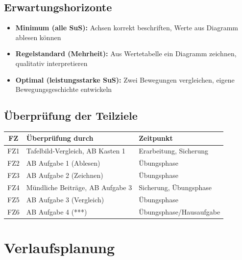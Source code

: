 \documentclass[11pt,a4paper]{article}
\begin{document}
\subsection{Erwartungshorizonte}
\begin{itemize}
    \item \textbf{Minimum (alle SuS):} Achsen korrekt beschriften, Werte aus Diagramm ablesen können
    \item \textbf{Regelstandard (Mehrheit):} Aus Wertetabelle ein Diagramm zeichnen, qualitativ interpretieren
    \item \textbf{Optimal (leistungsstarke SuS):} Zwei Bewegungen vergleichen, eigene Bewegungsgeschichte entwickeln
\end{itemize}

\subsection{Überprüfung der Teilziele}
\begin{tabular}{|c|l|l|}
\hline
\textbf{FZ} & \textbf{Überprüfung durch} & \textbf{Zeitpunkt} \\
\hline
FZ1 & Tafelbild-Vergleich, AB Kasten 1 & Erarbeitung, Sicherung \\
\hline
FZ2 & AB Aufgabe 1 (Ablesen) & Übungsphase \\
\hline
FZ3 & AB Aufgabe 2 (Zeichnen) & Übungsphase \\
\hline
FZ4 & Mündliche Beiträge, AB Aufgabe 3 & Sicherung, Übungsphase \\
\hline
FZ5 & AB Aufgabe 3 (Vergleich) & Übungsphase \\
\hline
FZ6 & AB Aufgabe 4 (***) & Übungsphase/Hausaufgabe \\
\hline
\end{tabular}

\section{Verlaufsplanung}
\end{document}
